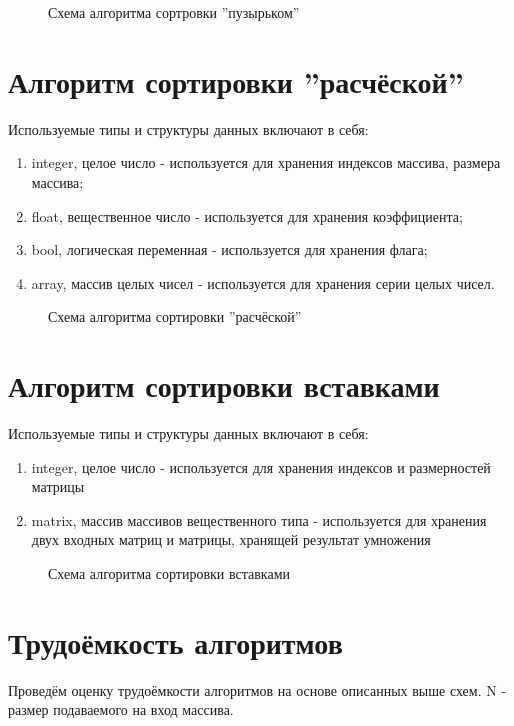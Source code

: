 \newpage

\begin{figure}[ph!]
	\caption{Схема алгоритма сортровки ''пузырьком''}
\end{figure}

\section{Алгоритм сортировки ''расчёской''}

Используемые типы и структуры данных включают в себя:
\begin{enumerate}
	\item integer, целое число - используется для хранения индексов массива, размера массива;
	\item float, вещественное число - используется для хранения коэффициента;
	\item bool, логическая переменная - используется для хранения флага;
	\item array, массив целых чисел - используется для хранения серии целых чисел.
\end{enumerate}

\newpage
\begin{figure}[ph!]
	\caption{Схема алгоритма сортировки ''расчёской''}
\end{figure}

\section{Алгоритм сортировки вставками}

Используемые типы и структуры данных включают в себя:
\begin{enumerate}
	\item integer, целое число - используется для хранения индексов и размерностей матрицы
	\item matrix, массив массивов вещественного типа - используется для хранения двух входных матриц и матрицы, хранящей результат умножения
\end{enumerate}

\newpage
\begin{figure}[ph!]
	\caption{Схема алгоритма сортировки вставками}
\end{figure}

\section{Трудоёмкость алгоритмов}
Проведём оценку трудоёмкости алгоритмов на основе описанных выше схем. N - размер подаваемого на вход массива.

